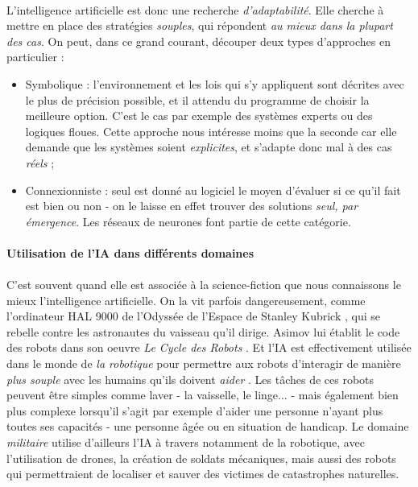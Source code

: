 \paragraph{} L'intelligence artificielle est donc une recherche \emph{d'adaptabilité}. Elle cherche à mettre en place des
stratégies \emph{souples}, qui répondent \emph{au mieux dans la plupart des cas}. On peut, dans ce grand courant, découper
deux types d'approches en particulier :
\begin{itemize}
    \item Symbolique : l'environnement et les lois qui s'y appliquent sont décrites avec le plus de précision possible,
    et il attendu du programme de choisir la meilleure option. C'est le cas par exemple des systèmes experts ou des
    logiques floues. Cette approche nous intéresse moins que la seconde car elle demande que les systèmes soient \emph{
    explicites}, et s'adapte donc mal à des cas \emph{réels} ;
    \item Connexionniste : seul est donné au logiciel le moyen d'évaluer si ce qu'il fait est bien ou non - on le laisse
    en effet trouver des solutions \emph{seul, par émergence}. Les réseaux de neurones font partie de cette catégorie.
\end{itemize}

\paragraph{Utilisation de l'IA dans différents domaines}

\paragraph{} C'est souvent quand elle est associée à la science-fiction que nous connaissons le mieux l'intelligence
artificielle. On la vit parfois dangereusement, comme l'ordinateur HAL 9000 de l'Odyssée de l'Espace de Stanley Kubrick 
\cite{Kubrick0}, qui se rebelle contre les astronautes du vaisseau qu'il dirige. Asimov lui établit le code des robots dans 
son oeuvre \emph{Le Cycle des Robots} \cite{Asimov1}. Et l'IA est effectivement utilisée dans le monde de \emph{la robotique} 
pour permettre aux robots d'interagir de manière \emph{plus souple} avec les humains qu'ils doivent \emph{aider} \cite{AI1}. Les 
tâches de ces robots peuvent être simples comme laver - la vaisselle, le linge... - mais également bien plus complexe 
lorsqu'il s'agit par exemple d'aider une personne n'ayant plus toutes ses capacités - une personne âgée ou en situation 
de handicap. Le domaine \emph{militaire} utilise d'ailleurs l'IA à travers notamment de la robotique, avec l'utilisation 
de drones, la création de soldats mécaniques, mais aussi des robots qui permettraient de localiser et sauver des victimes 
de catastrophes naturelles.

